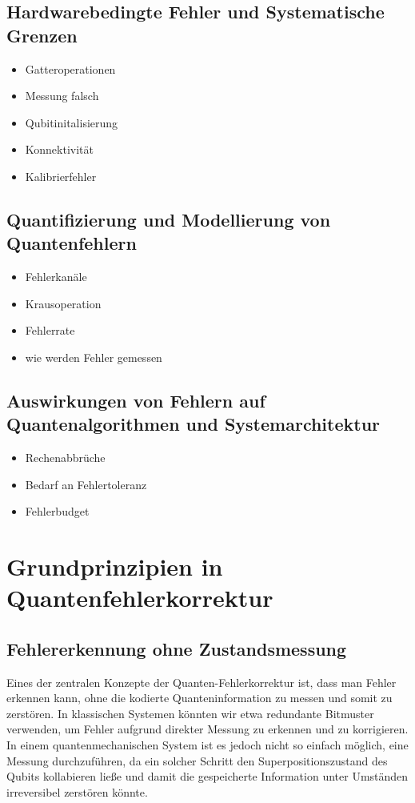 \subsection{Hardwarebedingte Fehler und Systematische Grenzen}
\begin{itemize}
\item Gatteroperationen
\item Messung falsch
\item Qubitinitalisierung
\item Konnektivität
\item Kalibrierfehler
\end{itemize}

\subsection{Quantifizierung und Modellierung von Quantenfehlern}
\begin{itemize}
\item Fehlerkanäle
\item Krausoperation
\item Fehlerrate
\item wie werden Fehler gemessen
\end{itemize}

\subsection{Auswirkungen von Fehlern auf Quantenalgorithmen und Systemarchitektur}
\begin{itemize}
\item Rechenabbrüche
\item Bedarf an Fehlertoleranz
\item Fehlerbudget
\end{itemize}


\section{Grundprinzipien in Quantenfehlerkorrektur}\label{chap:QEC2}
\subsection{Fehlererkennung ohne Zustandsmessung}
Eines der zentralen Konzepte der Quanten-Fehlerkorrektur ist, dass man Fehler erkennen kann, ohne die kodierte Quanteninformation zu messen und somit zu zerstören. In klassischen Systemen könnten wir etwa redundante Bitmuster verwenden, um Fehler aufgrund direkter Messung zu erkennen und zu korrigieren. In einem quantenmechanischen System ist es jedoch nicht so einfach möglich, eine Messung durchzuführen, da ein solcher Schritt den Superpositionszustand des Qubits kollabieren ließe und damit die gespeicherte Information unter Umständen irreversibel zerstören könnte. \cite{nielsen_michael_a_and_isaac_l_chuang_quantum_2010}

